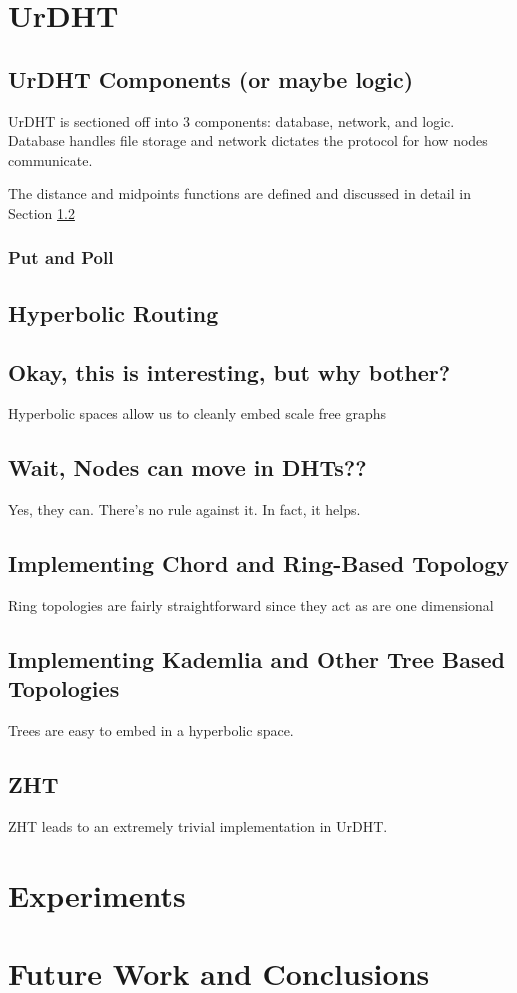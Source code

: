 \documentclass[11pt,conference]{IEEEtran}
\begin{document}
\section{UrDHT}
\label{sec:urdht}
	\subsection{UrDHT Components (or maybe logic)}
	
	UrDHT is sectioned off into 3 components: database, network, and logic.
	Database handles file storage and network dictates the protocol for how nodes communicate.
	
	The distance and midpoints functions are defined and discussed in detail in Section \ref{sec:hyper}
	
	\subsubsection{Put and Poll}
	\subsection{Hyperbolic Routing}
	\label{sec:hyper}
	
	\subsection{Okay, this is interesting, but why bother?}
	
	Hyperbolic spaces allow us to cleanly embed scale free graphs
	
	\subsection{Wait, Nodes can move in DHTs??}
	Yes, they can.  
	There's no rule against it. 
	In fact, it helps.
	
	\subsection{Implementing Chord and Ring-Based Topology}
	
	Ring topologies are fairly straightforward since they act as are one dimensional
	
	
	\subsection{Implementing Kademlia and Other Tree Based Topologies}
	Trees are easy to embed in a hyperbolic space.
	\subsection{ZHT}
	ZHT leads to an extremely trivial implementation in UrDHT.
	
\section{Experiments}
\label{sec:experiments}

\section{Future Work and Conclusions}
\label{sec:future}



\end{document}
